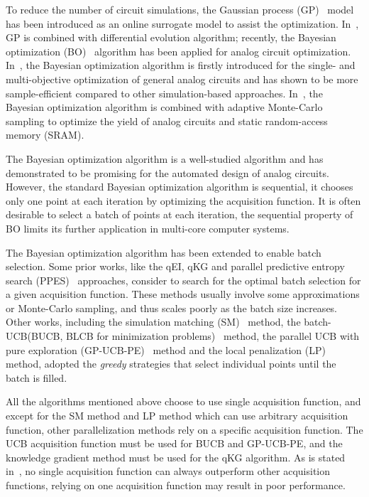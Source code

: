 %
To reduce the number of circuit simulations, the Gaussian process
(GP)~\cite{GPML} model has been introduced as an online surrogate model to
assist the optimization. In~\cite{liu2014gaspad}, GP is combined with
differential evolution algorithm; recently, the
Bayesian optimization (BO)~\cite{shahriari2016taking} algorithm has been
applied for analog circuit optimization. In~\cite{lyu2017efficient}, the Bayesian optimization algorithm is
firstly introduced for the single- and multi-objective optimization of general analog circuits and has
shown to be more sample-efficient compared to other simulation-based
approaches. In~\cite{wang2017efficient}, the Bayesian optimization algorithm
is combined with adaptive Monte-Carlo sampling to optimize the yield of analog
circuits and static random-access memory (SRAM).

The Bayesian optimization algorithm is a well-studied algorithm and has
demonstrated to be promising for the automated design of analog circuits.
However, the standard Bayesian optimization algorithm is sequential, it chooses
only one point at each iteration by optimizing the acquisition function. It is
often desirable to select a batch of points at each iteration, the sequential
property of BO limits its further application in multi-core computer systems.

The Bayesian optimization algorithm has been extended to enable batch
selection. Some prior works, like the qEI\cite{qEI}, qKG\cite{wu2016parallel}
and parallel predictive entropy search (PPES)~\cite{shah2015parallel}
approaches, consider to search for the optimal batch selection for a given
acquisition function. These methods usually involve some approximations or
Monte-Carlo sampling, and thus scales poorly as the batch size increases. Other
works, including the simulation matching (SM)~\cite{azimi2010batch} method, the
batch-UCB(BUCB, BLCB for minimization
problems)~\cite{desautels2014parallelizing} method, the parallel UCB with pure
exploration (GP-UCB-PE)~\cite{contal2013parallel} method and the local
penalization (LP)~\cite{gonzalez2016batch} method, adopted the \emph{greedy}
strategies that select individual points until the batch is filled.

All the algorithms mentioned above choose to use single acquisition function,
and except for the SM method and LP method which can use arbitrary acquisition
function, other parallelization methods rely on a specific acquisition
function. The UCB acquisition function must be used for BUCB and GP-UCB-PE, and
the knowledge gradient method must be used for the qKG algorithm. As is stated
in~\cite{hoffman2011portfolio}, no single acquisition function can always
outperform other acquisition functions, relying on one acquisition function may
result in poor performance. 

